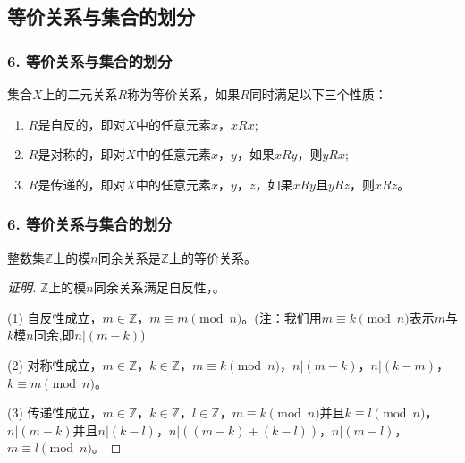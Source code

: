 \documentclass{beamer}
\begin{document}
\begin{CJK*}{UTF8}{gbsn}

\section{等价关系与集合的划分}
\begin{frame}
  \frametitle{6. 等价关系与集合的划分}
  \begin{Def}
    集合$X$上的二元关系$R$称为\alert{等价关系}，如果$R$同时满足以下三个性质：
    \begin{enumerate}[(1)]
    \item $R$是自反的，即对$X$中的任意元素$x$，$xRx$;
    \item $R$是对称的，即对$X$中的任意元素$x$，$y$，如果$xRy$，则$yRx$;
    \item $R$是传递的，即对$X$中的任意元素$x$，$y$，$z$，如果$xRy$且$yRz$，则$xRz$。
    \end{enumerate}
  \end{Def}
\end{frame}
\begin{frame}
  \frametitle{6. 等价关系与集合的划分}
  \begin{Ex}
    整数集$\mathbb{Z}$上的模$n$同余关系是$\mathbb{Z}$上的等价关系。
  \end{Ex}\pause
    \begin{proof}[证明]
    $\mathbb{Z}$上的模$n$同余关系满足自反性，。

    \pause(1) 自反性成立，$m\in \mathbb{Z}$，\pause$m\equiv m \pmod{n}$。\pause(注：我们用$m\equiv k \pmod{n}$表示$m$与$k$模$n$同余,即$n | (m-k)$)

    \pause(2) 对称性成立，$m\in \mathbb{Z}$，\pause$k\in \mathbb{Z}$，$m\equiv k \pmod{n}$，$n | (m-k)$，$n | (k-m)$，$k\equiv m \pmod{n}$。

   \pause (3) 传递性成立，$m\in \mathbb{Z}$，\pause$k\in \mathbb{Z}$，\pause$l\in \mathbb{Z}$，$m\equiv k \pmod{n}$并且$k\equiv l \pmod{n}$，$n | (m-k)$并且$n | (k-l)$，$n | ((m-k) + (k-l))$，$n | (m-l)$，$m\equiv l \pmod{n}$。
  \end{proof}
\end{frame}


\end{CJK*}
\end{document}
